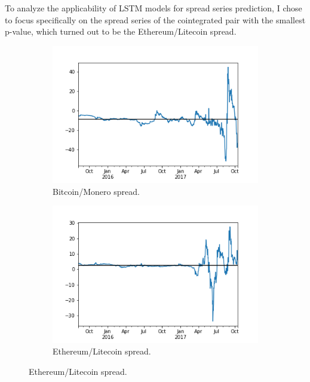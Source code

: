 \documentclass{article}
\begin{document}
To analyze the applicability of LSTM models for spread series prediction, I chose to focus specifically on the spread series of the cointegrated pair with the smallest p-value, which turned out to be the Ethereum/Litecoin spread. 

\begin{figure}
    \centering
    \begin{subfigure}[t]{0.49\textwidth}
        \centering
        \includegraphics[width=1.0\linewidth]{Spread1.png} 
        \caption{Bitcoin/Monero spread.} \label{fig:BM}
    \end{subfigure}
    \begin{subfigure}[t]{0.49\textwidth}
        \centering
        \includegraphics[width=1.0\linewidth]{Spread2.png} 
        \caption{Ethereum/Litecoin spread.} \label{fig:EL}
    \end{subfigure}


\end{figure}
\end{document}
